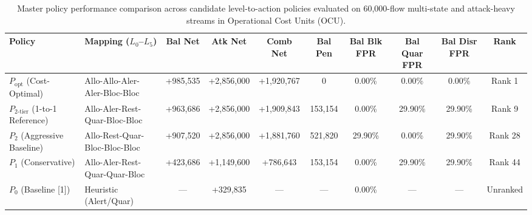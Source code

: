 \documentclass[journal,10pt,onecolumn]{IEEEtran}
\begin{document}
\begin{table}[t]
\caption{Master policy performance comparison across candidate level-to-action policies evaluated on 60,000-flow multi-state and attack-heavy streams in Operational Cost Units (OCU).}
\label{tab:master_policy}
\centering
\footnotesize
\begin{tabular}{llcccccccc}
\toprule
\textbf{Policy} & \textbf{Mapping ($L_0$--$L_5$)} & \textbf{Bal Net} & \textbf{Atk Net} & \textbf{Comb Net} & \textbf{Bal Pen} & \textbf{Bal Blk FPR} & \textbf{Bal Quar FPR} & \textbf{Bal Disr FPR} & \textbf{Rank} \\
\midrule
$P_{\text{opt}}$ (Cost-Optimal) & Allo-Allo-Aler-Aler-Bloc-Bloc & +985,535 & +2,856,000 & +1,920,767 & 0 & 0.00\% & 0.00\% & 0.00\% & Rank 1 \\
$P_{2\text{-tier}}$ (1-to-1 Reference) & Allo-Aler-Rest-Quar-Bloc-Bloc & +963,686 & +2,856,000 & +1,909,843 & 153,154 & 0.00\% & 29.90\% & 29.90\% & Rank 9 \\
$P_2$ (Aggressive Baseline) & Allo-Rest-Quar-Bloc-Bloc-Bloc & +907,520 & +2,856,000 & +1,881,760 & 521,820 & 29.90\% & 0.00\% & 29.90\% & Rank 28 \\
$P_1$ (Conservative) & Allo-Aler-Rest-Quar-Quar-Bloc & +423,686 & +1,149,600 & +786,643 & 153,154 & 0.00\% & 29.90\% & 29.90\% & Rank 44 \\
$P_0$ (Baseline [1]) & Heuristic (Alert/Quar) & --- & +329,835 & --- & --- & 0.00\% & --- & --- & Unranked \\
\bottomrule
\end{tabular}
\end{table}
\end{document}
